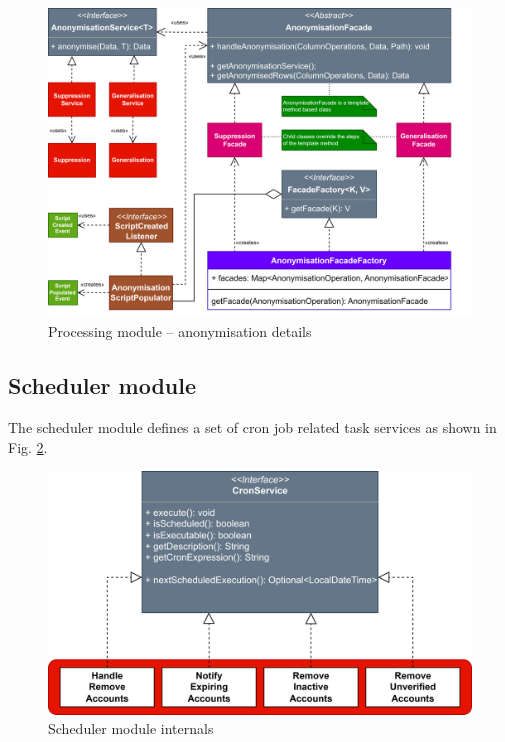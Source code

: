 \documentclass[a4paper,twoside,12pt]{book}
\begin{document}
\begin{figure}
  \centering
  \includegraphics[width=\linewidth]{img/anonymisation_everything.png}
  \caption{Processing module -- anonymisation details}
  \label{fig:anonymisation_everything}
\end{figure}

\subsection{Scheduler module}

The scheduler module defines a set of cron job related task services as shown in Fig. \ref{fig:scheduler_service}.

\begin{figure}
  \centering
  \includegraphics[width=\linewidth]{img/cron_service.png}
  \caption{Scheduler module internals}
  \label{fig:scheduler_service}
\end{figure}
\end{document}
